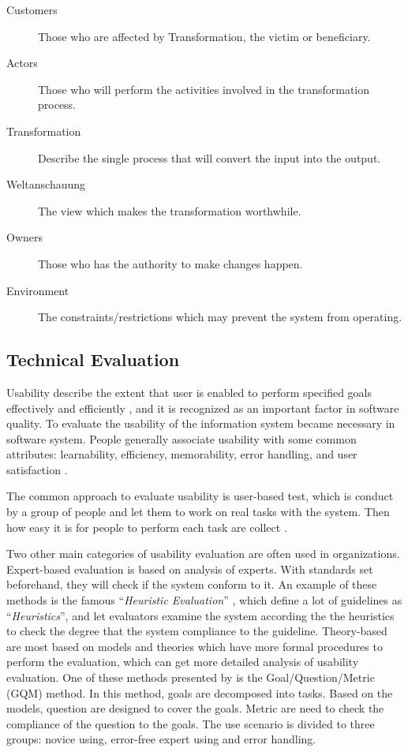 \documentclass[twocolumn]{article}
\begin{document}
\begin{description}
  \item[Customers]
    Those who are affected by Transformation, the victim or beneficiary.
  \item[Actors]
    Those who will perform the activities involved in the transformation process.
  \item[Transformation]
    Describe the single process that will convert the input into the output.
  \item[Weltanschauung]
    The view which makes the transformation worthwhile.
  \item[Owners]
    Those who has the authority to make changes happen.
  \item[Environment]
    The constraints/restrictions which may prevent the system from operating.
\end{description}

\subsection{Technical Evaluation}
Usability describe the extent that user is enabled to perform specified goals effectively and efficiently \citep{Ivory:2001:SAA:503112.503114}, and it is recognized as an important factor in software quality. To evaluate the usability of the information system became necessary in software system. People generally associate usability with some common attributes: learnability, efficiency, memorability, error handling, and user satisfaction \citep{Shneiderman1992}. 

The common approach to evaluate usability is user-based test, which is conduct by a group of people and let them to work on real tasks with the system. Then how easy it is for people to perform each task are collect \citep{Dumas1993}.

Two other main categories of usability evaluation are often used in organizations. Expert-based evaluation is based on analysis of experts. With standards set beforehand, they will check if the system conform to it. An example of these methods is the famous “\emph{Heuristic Evaluation}” \citep{Nielsen1994}, which define a lot of guidelines as “\emph{Heuristics}”, and let evaluators examine the system according the the heuristics to check the degree that the system compliance to the guideline. Theory-based are most based on models and theories which have more formal procedures to perform the evaluation, which can get more detailed analysis of usability evaluation. One of these methods presented by \citet{Zhang1996} is the Goal/Question/Metric (GQM) method. In this method, goals are decomposed into tasks. Based on the models, question are designed to cover the goals. Metric are need to check the compliance of the question to the goals. The use scenario is divided to three groups: novice using, error-free expert using and error handling.
\end{document}
